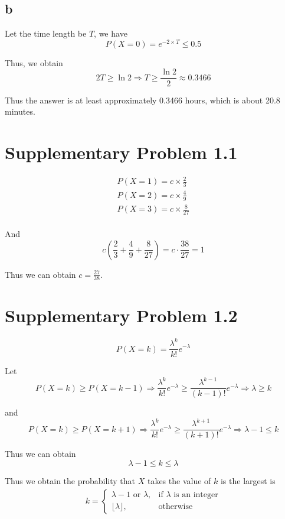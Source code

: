 \documentclass[a4paper, UTF-8]{article}
\theoremstyle{plain}
\begin{document}
\subsection{b} 

Let the time length be $T$, we have 
$$
P(X = 0) = e^{-2 \times T} \leq 0.5
$$

Thus, we obtain 
$$
2T \geq \ln 2 \Rightarrow T \geq \frac{\ln 2}{2} \approx 0.3466
$$

Thus the answer is at least approximately 0.3466 hours, which is about 20.8 minutes.

\section{Supplementary Problem 1.1}

\begin{align*} 
    P(X = 1) = c\times \frac{2}{3} \\ 
    P(X = 2) = c\times \frac{4}{9} \\
    P(X = 3) = c\times \frac{8}{27} \\
\end{align*}

And 
$$
c(\frac{2}{3} + \frac{4}{9} + \frac{8}{27}) =  c \cdot \frac{38}{27} = 1
$$

Thus we can obtain $c = \frac{27}{38}$.

\section{Supplementary Problem 1.2}

$$
P(X = k) = \frac{\lambda^k}{k!}e^{-\lambda}
$$

Let 
$$
P(X = k) \geq P(X = k-1) \Rightarrow \frac{\lambda^k}{k!}e^{-\lambda} \geq \frac{\lambda^{k-1}}{(k-1)!}e^{-\lambda} \Rightarrow \lambda \geq k
$$

and 
$$
P(X = k) \geq P(X = k+1) \Rightarrow \frac{\lambda^k}{k!}e^{-\lambda} \geq \frac{\lambda^{k+1}}{(k+1)!}e^{-\lambda} \Rightarrow \lambda - 1\leq k
$$

Thus we can obtain
$$
\lambda - 1 \leq k \leq \lambda
$$

Thus we obtain the probability that $X$ takes the value of $k$ is the largest is
\begin{align*} 
    k = \begin{cases}
    \lambda - 1 \text{ or } \lambda, & \text{if } \lambda \text{ is an integer} \\
    \lfloor\lambda\rfloor, & \text{otherwise}
    \end{cases}
\end{align*}
\end{document}
